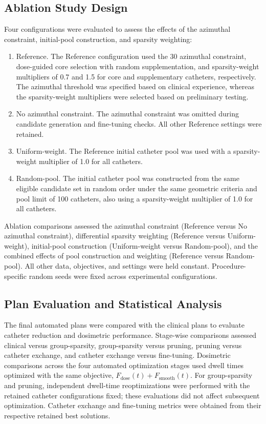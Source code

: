 \documentclass[12pt,twoside,letterpaper]{article}
\begin{document}
\subsection{Ablation Study Design}\label{sec:2-3}

Four configurations were evaluated to assess the effects of the azimuthal constraint, initial-pool construction, and sparsity weighting:

\begin{enumerate}
\item Reference. The Reference configuration used the 30\textdegree{} azimuthal constraint, dose-guided core selection with random supplementation, and sparsity-weight multipliers of 0.7 and 1.5 for core and supplementary catheters, respectively. The azimuthal threshold was specified based on clinical experience, whereas the sparsity-weight multipliers were selected based on preliminary testing.
\item No azimuthal constraint. The azimuthal constraint was omitted during candidate generation and fine-tuning checks. All other Reference settings were retained.
\item Uniform-weight. The Reference initial catheter pool was used with a sparsity-weight multiplier of 1.0 for all catheters.
\item Random-pool. The initial catheter pool was constructed from the same eligible candidate set in random order under the same geometric criteria and pool limit of 100 catheters, also using a sparsity-weight multiplier of 1.0 for all catheters.
\end{enumerate}

Ablation comparisons assessed the azimuthal constraint (Reference versus No azimuthal constraint), differential sparsity weighting (Reference versus Uniform-weight), initial-pool construction (Uniform-weight versus Random-pool), and the combined effects of pool construction and weighting (Reference versus Random-pool). All other data, objectives, and settings were held constant. Procedure-specific random seeds were fixed across experimental configurations.

\subsection{Plan Evaluation and Statistical Analysis}\label{sec:2-4}

The final automated plans were compared with the clinical plans to evaluate catheter reduction and dosimetric performance. Stage-wise comparisons assessed clinical versus group-sparsity, group-sparsity versus pruning, pruning versus catheter exchange, and catheter exchange versus fine-tuning. Dosimetric comparisons across the four automated optimization stages used dwell times optimized with the same objective, $F_{\text{dose}}\left( t \right) + F_{\text{smooth}}\left( t \right)$. For group-sparsity and pruning, independent dwell-time reoptimizations were performed with the retained catheter configurations fixed; these evaluations did not affect subsequent optimization. Catheter exchange and fine-tuning metrics were obtained from their respective retained best solutions.
\end{document}
